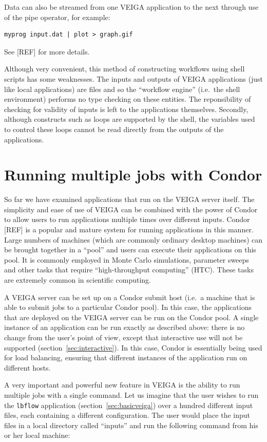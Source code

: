 \documentclass[a4paper]{article}
\begin{document}
\begin{multicols}{2}
Data can also be streamed from one VEIGA application to the next through use of the pipe operator, for example:

\begin{verbatim}
myprog input.dat | plot > graph.gif
\end{verbatim}
See [REF] for more details.

Although very convenient, this method of constructing workflows using shell scripts has some weaknesses. The inputs and outputs of VEIGA applications (just like local applications) are files and so the ``workflow engine'' (i.e.\ the shell environment) performs no type checking on these entities.  The reponsibility of checking for validity of inputs is left to the applications themselves.  Secondly, although constructs such as loops are supported by the shell, the variables used to control these loops cannot be read directly from the outputs of the applications.

\section{Running multiple jobs with Condor}\label{sec:condor}
So far we have examined applications that run on the VEIGA server itself.  The simplicity and ease of use of VEIGA can be combined with the power of Condor to allow users to run applications multiple times over different inputs.  Condor [REF] is a popular and mature system for running applications in this manner.  Large numbers of machines (which are commonly ordinary desktop machines) can be brought together in a ``pool'' and users can execute their applications on this pool.  It is commonly employed in Monte Carlo simulations, parameter sweeps and other tasks that require ``high-throughput computing'' (HTC).  These tasks are extremely common in scientific computing.

A VEIGA server can be set up on a Condor submit host (i.e.\ a machine that is able to submit jobs to a particular Condor pool).  In this case, the applications that are deployed on the VEIGA server can be run on the Condor pool.  A single instance of an application can be run exactly as described above: there is no change from the user's point of view, except that interactive use will not be supported (section~\ref{sec:interactive}).  In this case, Condor is essentially being used for load balancing, ensuring that different instances of the application run on different hosts.

A very important and powerful new feature in VEIGA is the ability to run multiple jobs with a single command.  Let us imagine that the user wishes to run the  {\tt lbflow} application (section~\ref{sec:basicveiga}) over a hundred different input files, each containing a different configuration.  The user would place the input files in a local directory called ``inputs'' and run the following command from his or her local machine:


\end{multicols}
\end{document}
